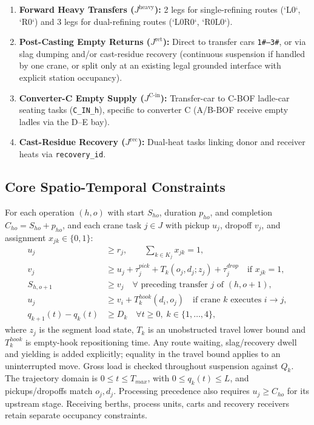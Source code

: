 \documentclass[11pt,a4paper]{article}
\begin{document}
\begin{enumerate}[leftmargin=1.5em,itemsep=2pt]
  \item \textbf{Forward Heavy Transfers ($J^{\text{heavy}}$):} 2 legs for single-refining routes (`L0`, `R0`) and 3 legs for dual-refining routes (`L0R0`, `R0L0`).
  \item \textbf{Post-Casting Empty Returns ($J^{\text{ret}}$):} Direct to transfer cars \texttt{1\#--3\#}, or via slag dumping and/or cast-residue recovery (continuous suspension if handled by one crane, or split only at an existing legal grounded interface with explicit station occupancy).
  \item \textbf{Converter-C Empty Supply ($J^{\text{C-in}}$):} Transfer-car to C-BOF ladle-car seating tasks (\texttt{C\_IN\_h}), specific to converter C (A/B-BOF receive empty ladles via the D--E bay).
  \item \textbf{Cast-Residue Recovery ($J^{\text{rec}}$):} Dual-heat tasks linking donor and receiver heats via \texttt{recovery\_id}.
\end{enumerate}

\subsection{Core Spatio-Temporal Constraints}
For each operation $(h,o)$ with start $S_{ho}$, duration $p_{ho}$, and completion $C_{ho} = S_{ho} + p_{ho}$, and each crane task $j \in J$ with pickup $u_j$, dropoff $v_j$, and assignment $x_{jk} \in \{0,1\}$:
\begin{align}
  u_j &\ge r_j, \qquad \sum_{k \in K_j} x_{jk} = 1, \\
  v_j &\ge u_j + \tau_j^{pick} + T_k(o_j,d_j;z_j) + \tau_j^{drop} \quad \text{if } x_{jk}=1, \\
  S_{h,o+1} &\ge v_j \quad \forall \text{ preceding transfer } j \text{ of } (h,o+1), \\
  u_j &\ge v_i + T_k^{hook}(d_i,o_j) \quad \text{if crane } k \text{ executes } i \to j, \\
  q_{k+1}(t) - q_k(t) &\ge D_k \quad \forall t \ge 0,\; k \in \{1,\dots,4\},
\end{align}
where $z_j$ is the segment load state, $T_k$ is an unobstructed travel lower bound and $T_k^{hook}$ is empty-hook repositioning time. Any route waiting, slag/recovery dwell and yielding is added explicitly; equality in the travel bound applies to an uninterrupted move. Gross load is checked throughout suspension against $Q_k$. The trajectory domain is $0\le t\le T_{max}$, with $0\le q_k(t)\le L$, and pickups/dropoffs match $o_j,d_j$. Processing precedence also requires $u_j\ge C_{ho}$ for its upstream stage. Receiving berths, process units, carts and recovery receivers retain separate occupancy constraints.
\end{document}
